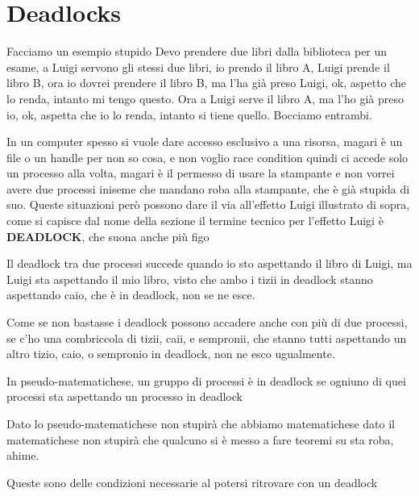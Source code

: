 \documentclass[11pt]{article}
\date{\today}
\title{}
\begin{document}
\tableofcontents

\section{Deadlocks}
\label{sec:org8344d14}

Facciamo un esempio stupido
Devo prendere due libri dalla biblioteca per un esame, a Luigi servono gli stessi due
libri, io prendo il libro A, Luigi prende il libro B, ora io dovrei prendere il libro
B, ma l'ha già preso Luigi, ok, aspetto che lo renda, intanto mi tengo questo.
Ora a Luigi serve il libro A, ma l'ho già preso io, ok, aspetta che io lo renda,
intanto si tiene quello.
Bocciamo entrambi.

In un computer spesso si vuole dare accesso esclusivo a una risorsa, magari è
un file o un handle per non so cosa, e non voglio race condition quindi ci accede
solo un processo alla volta, magari è il permesso di usare la stampante e non vorrei
avere due processi iniseme che mandano roba alla stampante, che è già stupida di
suo. Queste situazioni però possono dare il via all'effetto Luigi illustrato di
sopra, come si capisce dal nome della sezione il termine tecnico per l'effetto Luigi
è \textbf{DEADLOCK}, che suona anche più figo

Il deadlock tra due processi succede quando io sto aspettando il libro di Luigi, ma
Luigi sta aspettando il mio libro, visto che ambo i tizii in deadlock stanno
aspettando caio, che è in deadlock, non se ne esce.

Come se non bastasse i deadlock possono accadere anche con più di due processi, se
c'ho una combriccola di tizii, caii, e sempronii, che stanno tutti aspettando un
altro tizio, caio, o sempronio in deadlock, non ne esco ugualmente.

In pseudo-matematichese, un gruppo di processi è in deadlock se ogniuno di quei
processi sta aspettando un processo in deadlock

Dato lo pseudo-matematichese non stupirà che abbiamo matematichese
dato il matematichese non stupirà che qualcuno si è messo a fare teoremi su sta roba,
ahime.

Queste sono delle condizioni necessarie al potersi ritrovare con un deadlock
\end{document}
